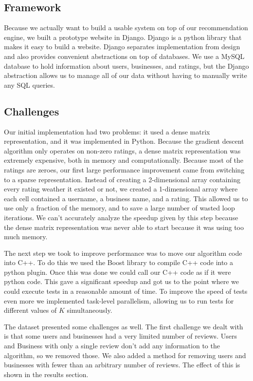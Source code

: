 \subsection{Framework}

Because we actually want to build a usable system on top of our recommendation
engine, we built a prototype website in Django. Django is a python library that
makes it easy to build a website. Django separates implementation from design
and also provides convenient abstractions on top of databases. We use a MySQL
database to hold information about users, businesses, and ratings, but the
Django abstraction allows us to manage all of our data without having to
manually write any SQL queries.

\subsection{Challenges}

Our initial implementation had two problems: it used a dense matrix
representation, and it was implemented in Python. Because the gradient descent
algorithm only operates on non-zero ratings, a dense matrix representation was
extremely expensive, both in memory and computationally. Because most of the
ratings are zeroes, our first large performance improvement came from switching
to a sparse representation. Instead of creating a 2-dimensional array containing
every rating weather it existed or not, we created a 1-dimensional array where
each cell contained a username, a business name, and a rating. This allowed us
to use only a fraction of the memory, and to save a large number of wasted loop
iterations. We can't accurately analyze the speedup given by this step because
the dense matrix representation was never able to start because it was using too
much memory. 

The next step we took to improve performance was to move our algorithm code into
C++. To do this we used the Boost library to compile C++ code into a python
plugin. Once this was done we could call our C++ code as if it were python code.
This gave a significant speedup and got us to the point where we could execute
tests in a reasonable amount of time. To improve the speed of tests even more we
implemented task-level parallelism, allowing us to run tests for different
values of $K$ simultaneously.

The dataset presented some challenges as well. The first challenge we dealt with
is that some users and businesses had a very limited number of reviews. Users
and Business with only a single review don't add any information to the
algorithm, so we removed those. We also added a method for removing users and
businesses with fewer than an arbitrary number of reviews. The effect of this is
shown in the results section.
